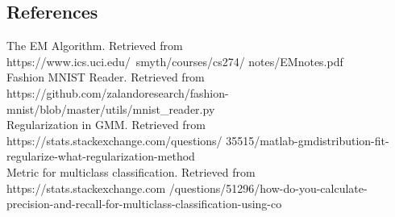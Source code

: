\documentclass[12pt,journal,compsoc]{IEEEtran}
\begin{document}
\subsection{References}

\noindent [1] The EM Algorithm. Retrieved from https://www.ics.uci.edu/~smyth/courses/cs274/
notes/EMnotes.pdf\\
\noindent [2] Fashion MNIST Reader. Retrieved from https://github.com/zalandoresearch/fashion-mnist/blob/master/utils/mnist\_reader.py\\
\noindent [3] Regularization in GMM. Retrieved from https://stats.stackexchange.com/questions/
35515/matlab-gmdistribution-fit-regularize-what-regularization-method\\
\noindent [4] Metric for multiclass classification. Retrieved from https://stats.stackexchange.com
/questions/51296/how-do-you-calculate-precision-and-recall-for-multiclass-classification-using-co
\end{document}
